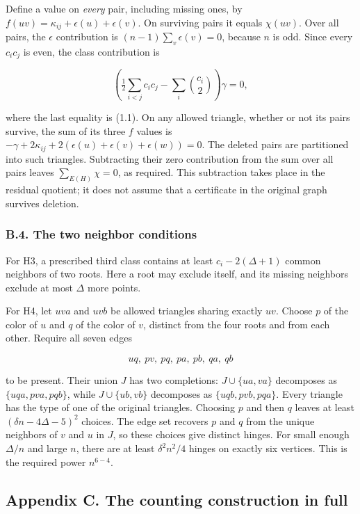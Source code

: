 \documentclass[english,11pt,a4paper]{article}
\begin{document}
Define a value on \emph{every} pair, including missing ones, by \(f(uv)=\kappa_{ij}+\epsilon(u)+\epsilon(v)\). On surviving pairs it equals \(\chi(uv)\). Over all pairs, the \(\epsilon\) contribution is \((n-1)\sum_v\epsilon(v)=0\), because \(n\) is odd. Since every \(c_ic_j\) is even, the class contribution is

\[\left(\tfrac12\sum_{i<j}c_ic_j-\sum_i\binom{c_i}{2}\right)\gamma=0,\]

where the last equality is (1.1). On any allowed triangle, whether or not its pairs survive, the sum of its three \(f\) values is \(-\gamma+2\kappa_{ij}+2(\epsilon(u)+\epsilon(v)+\epsilon(w))=0\). The deleted pairs are partitioned into such triangles. Subtracting their zero contribution from the sum over all pairs leaves \(\sum_{E(H)}\chi=0\), as required. This subtraction takes place in the residual quotient; it does not assume that a certificate in the original graph survives deletion.

\subsubsection{B.4. The two neighbor conditions}\label{b.4.-the-two-neighbor-conditions}

For H3, a prescribed third class contains at least \(c_i-2(\Delta+1)\) common neighbors of two roots. Here a root may exclude itself, and its missing neighbors exclude at most \(\Delta\) more points.

For H4, let \(uva\) and \(uvb\) be allowed triangles sharing exactly \(uv\). Choose \(p\) of the color of \(u\) and \(q\) of the color of \(v\), distinct from the four roots and from each other. Require all seven edges

\[uq,\ pv,\ pq,\ pa,\ pb,\ qa,\ qb\]

to be present. Their union \(J\) has two completions: \(J\cup\{ua,va\}\) decomposes as \(\{uqa,pva,pqb\}\), while \(J\cup\{ub,vb\}\) decomposes as \(\{uqb,pvb,pqa\}\). Every triangle has the type of one of the original triangles. Choosing \(p\) and then \(q\) leaves at least \((\delta n-4\Delta-5)^2\) choices. The edge set recovers \(p\) and \(q\) from the unique neighbors of \(v\) and \(u\) in \(J\), so these choices give distinct hinges. For small enough \(\Delta/n\) and large \(n\), there are at least \(\delta^2n^2/4\) hinges on exactly six vertices. This is the required power \(n^{6-4}\).

\subsection{Appendix C. The counting construction in full}\label{appendix-c.-the-counting-construction-in-full}
\end{document}
